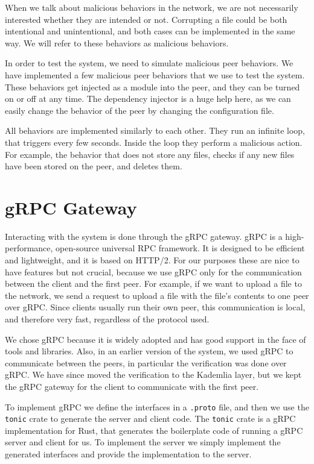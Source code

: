 When we talk about malicious behaviors in the network,
we are not necessarily interested whether they are intended or not.
Corrupting a file could be both intentional and unintentional,
and both cases can be implemented in the same way.
We will refer to these behaviors as malicious behaviors.

In order to test the system, we need to simulate malicious peer behaviors.
We have implemented a few malicious peer behaviors that we use to test the system.
These behaviors get injected as a module into the peer,
and they can be turned on or off at any time.
The dependency injector is a huge help here, as we can easily change the behavior of the peer
by changing the configuration file.

All behaviors are implemented similarly to each other.
They run an infinite loop, that triggers every few seconds.
Inside the loop they perform a malicious action.
For example, the behavior that does not store any files,
checks if any new files have been stored on the peer, and deletes them.

\section{gRPC Gateway}

Interacting with the system is done through the gRPC gateway.
gRPC is a high-performance, open-source universal RPC framework.
It is designed to be efficient and lightweight, and it is based on HTTP/2.
For our purposes these are nice to have features but not crucial,
because we use gRPC only for the communication between the client and the first peer.
For example, if we want to upload a file to the network,
we send a request to upload a file with the file's contents to one peer over gRPC.
Since clients usually run their own peer, this communication is local,
and therefore very fast, regardless of the protocol used.

We chose gRPC because it is widely adopted and has good support in the face of
tools and libraries.
Also, in an earlier version of the system, we used gRPC to communicate between the peers,
in particular the verification was done over gRPC.
We have since moved the verification to the Kademlia layer,
but we kept the gRPC gateway for the client to communicate with the first peer.

To implement gRPC we define the interfaces in a \texttt{.proto} file,
and then we use the \texttt{tonic} crate to generate the server and client code.
The \texttt{tonic} crate is a gRPC implementation for Rust,
that generates the boilerplate code of running a gRPC server and client for us.
To implement the server we simply implement the generated interfaces
and provide the implementation to the server.

